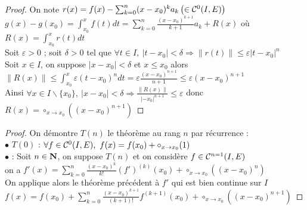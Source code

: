     \begin{proof}
    On note $r(x) = f(x) - \sum_{k=0}^n (x-x_0)^k a_k \left(\in{\mathcal{C}}^0 (I,E) \right)$ \\ 
    $g(x)-g(x_0) = \int_{x_0}^x f(t)dt = \sum_{k=0}^{n} \frac{(x-x_0)^{k+1}}{k+1} a_k + R(x)$ où $R(x) = \int_{x_0}^x r(t) dt$\\
    Soit $\varepsilon >0$ ; soit $\delta >0$ tel que $\forall t\in I ,~|t-x_0| <\delta \Rightarrow \|r(t)\| \leqslant \varepsilon |t-x_0|^n$ \\
    Soit $x\in I$, on suppose $|x-x_0| <\delta$ et $x\leqslant x_0$ alors $\|R(x)\| \leqslant \int_{x_0}^x \varepsilon (t-x_0)^n dt = \varepsilon \frac{(x-x_0)^{n+1}}{n+1} \leqslant \varepsilon (x-x_0)^{n+1}$ \\ 
    Ainsi $\forall x\in I \backslash \{x_0\} ,~|x-x_0| <\delta \Rightarrow \frac{ \|R(x)\|}{|-x_0|^{n+1}} \leqslant \varepsilon$ donc $R(x) = \circ_{x\rightarrow x_0} \left( (x-x_0)^{n+1} \right)$ 
    \end{proof} \medskip
    
    
    \begin{proof}
    On démontre $T(n)$ le théorème au rang $n$ par récurrence : \\ 
    $\bullet$ $T(0)$ : $\forall f\in {\mathcal{C}}^0(I,E),~f(x) = f(x_0) + \circ_{x\rightarrow x_0} (1)$ \\ 
    $\bullet$ : Soit $n\in{\mathbf{N}}$, on suppose $T(n)$ et on considère $f\in{\mathcal{C}}^{n=1}(I,E)$ \\ 
    on a $f'(x) = \sum_{k=0}^n \frac{(x-x_0)^k}{k!} (f')^{(k)} (x_0) + \circ_{x\rightarrow x_0} \left( (x-x_0)^n \right)$ \\
    On applique alors le théorème précédent à $f'$ qui est bien continue sur $I$ \\ 
    $f(x) = f(x_0) + \sum_{k=0}^n \frac{(x-x_0)^{k+1}}{(k+1)!} f^{(k+1)} (x_0) + \circ_{x\rightarrow x_0} \left( (x-x_0)^{n+1} \right)$
    \end{proof} \medskip
    
    \fin
    
 